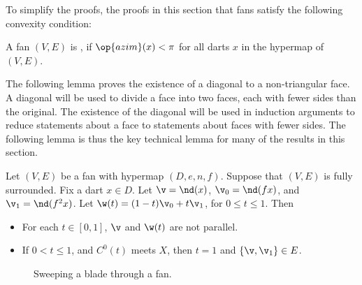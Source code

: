 To simplify the proofs, the proofs in this section that fans
satisfy the following  convexity condition:

\begin{definition}
A fan $(V,E)$ is , if $\op{azim}(x)<\pi$
for all darts $x$ in the hypermap of $(V,E)$.
\end{definition}
%

The following lemma proves the existence of a diagonal to a non-triangular
face.  A diagonal will be used to divide a face into two faces, each with fewer sides
than the original.  The existence of the diagonal will be used in induction arguments
to reduce statements about a face to statements about faces with fewer sides.
The following lemma is thus the key technical lemma for many of the results
in this section.

\begin{lemma}[sweep]\label{lemma:sweep}  
Let $(V,E)$ be a fan with hypermap $(D,e,n,f)$.  
Suppose that $(V,E)$ is fully surrounded. Fix a dart $x\in D$.
Let $\v = \nd(x)$, $\v_0 = \nd(f x)$,
and $\v_1 = \nd(f^2 x)$.  Let $\w(t) = (1-t) \v_0 + t \v_1$, for
$0\le t\le 1$.  Then
\begin{itemize}
\item  For each $t\in[0,1]$, $\v$ and $\w(t)$ are not parallel.
\item If $0 < t \le 1$, and $C^0(t)$ meets $X$, then $t=1$ and
$\{\v,\v_1\}\in E$.
\end{itemize}
\end{lemma}


\begin{figure}[htb]
\centering
{}
\caption{Sweeping a blade through a fan.}
\label{fig:vt}
\end{figure}


